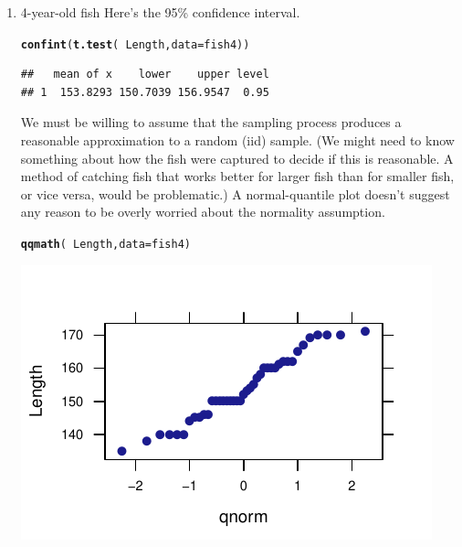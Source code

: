 \documentclass[twoside]{book}\usepackage[]{graphicx}\usepackage[]{xcolor}
\makeatletter
\def\maxwidth{ %
  \ifdim\Gin@nat@width>\linewidth
    \linewidth
  \else
    \Gin@nat@width
  \fi
}
\newcommand{\hlopt}[1]{\textcolor[rgb]{0,0,0}{#1}}%
\newcommand{\hlstd}[1]{\textcolor[rgb]{0.345,0.345,0.345}{#1}}%
\newcommand{\hlkwc}[1]{\textcolor[rgb]{0.333,0.667,0.333}{#1}}%
\newcommand{\hlkwd}[1]{\textcolor[rgb]{0.737,0.353,0.396}{\textbf{#1}}}%
\newenvironment{kframe}{%
 \def\at@end@of@kframe{}%
 \ifinner\ifhmode%
  \def\at@end@of@kframe{\end{minipage}}%
  \begin{minipage}{\columnwidth}%
 \fi\fi%
 \def\FrameCommand##1{\hskip\@totalleftmargin \hskip-\fboxsep
 \colorbox{shadecolor}{##1}\hskip-\fboxsep
     \hskip-\linewidth \hskip-\@totalleftmargin \hskip\columnwidth}%
 \MakeFramed {\advance\hsize-\width
   \@totalleftmargin\z@ \linewidth\hsize
   \@setminipage}}%
 {\par\unskip\endMakeFramed%
 \at@end@of@kframe}
\newenvironment{knitrout}{}{} %
\makeatother
\begin{document}
\begin{solution}
	\begin{enumerate}
		\item 4-year-old fish
Here's the 95\% confidence interval.
\begin{knitrout}
\color{fgcolor}\begin{kframe}
\begin{alltt}
\hlkwd{confint}\hlstd{(}\hlkwd{t.test}\hlstd{(} \hlopt{~} \hlstd{Length,} \hlkwc{data}\hlstd{=fish4))}
\end{alltt}
\begin{verbatim}
##   mean of x    lower    upper level
## 1  153.8293 150.7039 156.9547  0.95
\end{verbatim}
\end{kframe}
\end{knitrout}
\noindent
We must be willing to assume that the sampling process produces a reasonable approximation
to a random (iid) sample.  (We might need to know something about how the fish were 
captured to decide if this is reasonable.  A method of catching fish that works better for 
larger fish than for smaller fish, or vice versa, would be problematic.)  
A normal-quantile plot doesn't suggest any reason to be overly worried about
the normality assumption.
\begin{knitrout}
\color{fgcolor}\begin{kframe}
\begin{alltt}
\hlkwd{qqmath}\hlstd{(}\hlopt{~}\hlstd{Length,} \hlkwc{data}\hlstd{=fish4)}
\end{alltt}
\end{kframe}

{\centering \includegraphics[width=\maxwidth]{figures/fig-unnamed-chunk-150-1} 

}
\end{knitrout}
\end{enumerate}
\end{solution}
\end{document}
